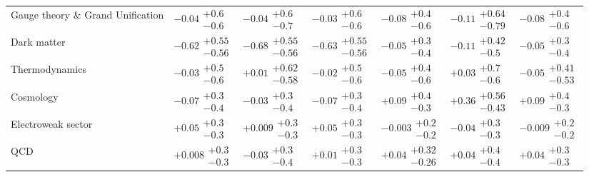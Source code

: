 \begin{table}[H]
\begin{tabular}{lllllll}
Gauge theory \& Grand Unification & $-0.04\substack{+0.6 \\ -0.6}$ & $-0.04\substack{+0.6 \\ -0.7}$ & $-0.03\substack{+0.6 \\ -0.6}$ & $-0.08\substack{+0.4 \\ -0.6}$ & $-0.11\substack{+0.64 \\ -0.79}$ & $-0.08\substack{+0.4 \\ -0.6}$ \\
Dark matter & $\bm{-0.62}\substack{+0.55 \\ -0.56}$ & $\bm{-0.68}\substack{+0.55 \\ -0.56}$ & $\bm{-0.63}\substack{+0.55 \\ -0.56}$ & $-0.05\substack{+0.3 \\ -0.4}$ & $-0.11\substack{+0.42 \\ -0.5}$ & $-0.05\substack{+0.3 \\ -0.4}$ \\
Thermodynamics & $-0.03\substack{+0.5 \\ -0.6}$ & $+0.01\substack{+0.62 \\ -0.58}$ & $-0.02\substack{+0.5 \\ -0.6}$ & $-0.05\substack{+0.4 \\ -0.6}$ & $+0.03\substack{+0.7 \\ -0.6}$ & $-0.05\substack{+0.41 \\ -0.53}$ \\
Cosmology & $-0.07\substack{+0.3 \\ -0.4}$ & $-0.03\substack{+0.3 \\ -0.4}$ & $-0.07\substack{+0.3 \\ -0.4}$ & $+0.09\substack{+0.4 \\ -0.3}$ & $+0.36\substack{+0.56 \\ -0.43}$ & $+0.09\substack{+0.4 \\ -0.3}$ \\
Electroweak sector & $+0.05\substack{+0.3 \\ -0.3}$ & $+0.009\substack{+0.3 \\ -0.3}$ & $+0.05\substack{+0.3 \\ -0.3}$ & $-0.003\substack{+0.2 \\ -0.2}$ & $-0.04\substack{+0.3 \\ -0.3}$ & $-0.009\substack{+0.2 \\ -0.2}$ \\
QCD & $+0.008\substack{+0.3 \\ -0.3}$ & $-0.03\substack{+0.3 \\ -0.4}$ & $+0.01\substack{+0.3 \\ -0.3}$ & $+0.04\substack{+0.32 \\ -0.26}$ & $+0.04\substack{+0.4 \\ -0.4}$ & $+0.04\substack{+0.3 \\ -0.3}$ \\

\end{tabular}
\end{table}
